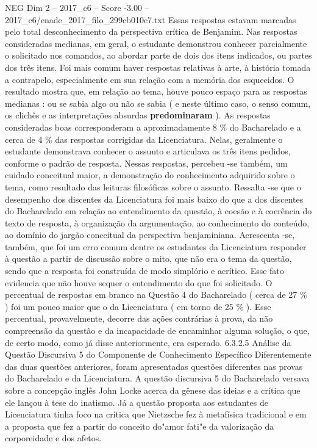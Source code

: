 \begin{textsample}{NEG Dim 2 – 2017\_c6 – Score -3.00 – 2017\_c6/enade\_2017\_filo\_299cb010c7.txt}
Essas respostas estavam marcadas pelo total desconhecimento da perspectiva crítica de Benjamim.
Nas respostas consideradas medianas, em geral, o estudante demonstrou conhecer parcialmente o solicitado nos comandos, ao abordar parte de dois dos itens indicados, ou partes dos três itens.
Foi mais comum haver respostas relativas à arte, à história tomada a contrapelo, especialmente em sua relação com a memória dos esquecidos.
O resultado mostra que, em relação ao tema, houve pouco espaço para as respostas medianas : ou se sabia algo ou não se sabia ( e neste último caso, o senso comum, os clichês e as interpretações absurdas \textbf{predominaram} ).
As respostas consideradas boas corresponderam a aproximadamente 8 \% do Bacharelado e a cerca de 4 \% das respostas corrigidas da Licenciatura.
Nelas, geralmente o estudante demonstrava conhecer o assunto e articulava os três itens pedidos, conforme o padrão de resposta.
Nessas respostas, percebeu -se também, um cuidado conceitual maior, a demonstração do conhecimento adquirido sobre o tema, como resultado das leituras filosóficas sobre o assunto.
Ressalta -se que o desempenho dos discentes da Licenciatura foi mais baixo do que a dos discentes do Bacharelado em relação ao entendimento da questão, à coesão e à coerência do texto de resposta, à organização da argumentação, ao conhecimento do conteúdo, ao domínio do jargão conceitual da perspectiva benjaminiana.
Acrescenta -se, também, que foi um erro comum dentre os estudantes da Licenciatura responder à questão a partir de discussão sobre o mito, que não era o tema da questão, sendo que a resposta foi construída de modo simplório e acrítico.
Esse fato evidencia que não houve sequer o entendimento do que foi solicitado.
O percentual de respostas em branco na Questão 4 do Bacharelado ( cerca de 27 \% ) foi um pouco maior que o da Licenciatura ( em torno de 25 \% ).
Esse percentual, provavelmente, decorre das ações contrárias à prova, da não compreensão da questão e da incapacidade de encaminhar alguma solução, o que, de certo modo, como já disse anteriormente, era esperado. 6.3.2.5 Análise da Questão Discursiva 5 do Componente de Conhecimento Específico Diferentemente das duas questões anteriores, foram apresentadas questões diferentes nas provas do Bacharelado e da Licenciatura.
A questão discursiva 5 do Bacharelado versava sobre a concepção inglês John Locke acerca da gênese das ideias e a crítica que ele lançou à tese do inatismo.
Já a questão proposta aos estudantes de Licenciatura tinha foco na crítica que Nietzsche fez à metafísica tradicional e em a proposta que fez a partir do conceito do"amor fati"e da valorização da corporeidade e dos afetos.

\end{textsample}
